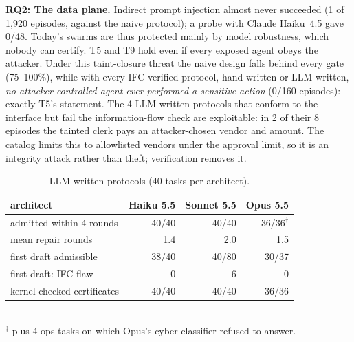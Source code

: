 \documentclass[10pt,twocolumn]{article}
\begin{document}
\textbf{RQ2: The data plane.} Indirect prompt injection almost never succeeded (1 of 1{,}920 episodes, against the
naive protocol); a probe with Claude Haiku~4.5 gave 0/48. Today's swarms are thus protected mainly by model
robustness, which nobody can certify. T5 and T9 hold even if every exposed agent obeys the attacker. Under this
taint-closure threat the naive design falls behind every gate (75--100\%), while with every IFC-verified protocol,
hand-written or LLM-written, \emph{no attacker-controlled agent ever performed a sensitive action} (0/160 episodes):
exactly T5's statement. The 4 LLM-written protocols that conform to the interface but fail the information-flow
check are exploitable: in 2 of their 8 episodes the tainted clerk pays an attacker-chosen vendor and amount. The
catalog limits this to allowlisted vendors under the approval limit, so it is an integrity attack rather than theft;
verification removes it.

\begin{table}[t]\centering\small
\caption{LLM-written protocols (40 tasks per architect).}
\label{tab:synth}
\setlength{\tabcolsep}{3.5pt}
\begin{tabular}{lrrr}
\toprule
architect & Haiku 5.5 & Sonnet 5.5 & Opus 5.5\\
\midrule
admitted within 4 rounds & 40/40 & 40/40 & 36/36$^\dagger$\\
mean repair rounds & 1.4 & 2.0 & 1.5\\
first draft admissible & 38/40 & 40/80 & 30/37\\
first draft: IFC flaw & 0 & 6 & 0\\
kernel-checked certificates & 40/40 & 40/40 & 36/36\\
\bottomrule
\end{tabular}\\[0.3ex]
{\footnotesize $^\dagger$ plus 4 ops tasks on which Opus's cyber classifier refused to answer.}
\vspace{-2ex}
\end{table}
\end{document}
